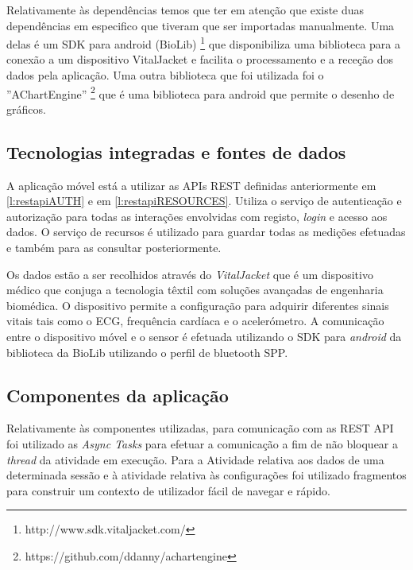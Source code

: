 Relativamente às dependências temos que ter em atenção que existe duas dependências em especifico que tiveram que ser importadas manualmente. Uma delas é um \gls{SDK} para android (BioLib) \footnote{http://www.sdk.vitaljacket.com/} que disponibiliza uma biblioteca para a conexão a um dispositivo VitalJacket e facilita o processamento e a receção dos dados pela aplicação. Uma outra biblioteca que foi utilizada foi o ''AChartEngine'' \footnote{https://github.com/ddanny/achartengine} que é uma biblioteca para android que permite o desenho de gráficos.




\subsection{Tecnologias integradas e fontes de dados}
A aplicação móvel está a utilizar as \gls{API}s \gls{REST} definidas anteriormente em \ref{l:restapiAUTH} e em \ref{l:restapiRESOURCES}. Utiliza o serviço de autenticação e autorização para todas as interações envolvidas com registo, \textit{login} e acesso aos dados. O serviço de recursos é utilizado para guardar todas as medições efetuadas e também para as consultar posteriormente.\par 
Os dados estão a ser recolhidos através do \textit{VitalJacket} que é um dispositivo médico que conjuga a tecnologia têxtil com soluções avançadas de engenharia biomédica. O dispositivo permite a configuração para adquirir diferentes sinais vitais tais como o \gls{ECG}, frequência cardíaca e o acelerómetro. A comunicação entre o dispositivo móvel e o sensor é efetuada utilizando o \gls{SDK} para \textit{android} da biblioteca da BioLib utilizando o perfil de bluetooth \gls{SPP}.




\subsection{Componentes da aplicação}

Relativamente às componentes utilizadas, para comunicação com as \gls{REST} \gls{API} foi utilizado as \textit{Async Tasks}\cite{android-asynctasks} para efetuar a comunicação a fim de não bloquear a \textit{thread} da atividade em execução. Para a Atividade relativa aos dados de uma determinada sessão e à atividade relativa às configurações foi utilizado fragmentos\cite{android-fragments} para construir um contexto de utilizador fácil de navegar e rápido.



